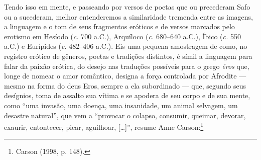 Tendo isso em mente, e passeando por versos de poetas que ou precederam Safo ou
a sucederam, melhor entenderemos a similaridade tremenda entre as imagens, a
linguagem e o tom de seus fragmentos eróticos e de versos marcados pelo
erotismo em Hesíodo (\textit{c.} 700 a.C.), Arquíloco (\textit{c.} 680--640
a.C.), Íbico (\textit{c.} 550 a.C.) e Eurípides (\textit{c.} 482--406 a.C.). Eis
uma pequena amostragem de como, no registro erótico de gêneros, poetas e
tradições distintos, é símil a linguagem para falar da paixão erótica, do
desejo nas traduções possíveis para o grego \textit{éros} que, longe de nomear
o amor romântico, designa a força controlada por Afrodite --- mesmo na forma do
deus Eros, sempre a ela subordinado --- que, segundo seus desígnios, toma de
assalto sua vítima e se apodera de seu corpo e de sua mente, como “uma invasão,
uma doença, uma insanidade, um animal selvagem, um desastre natural”, que vem a
“provocar o colapso, consumir, queimar, devorar, exaurir, entontecer, picar,
aguilhoar, [\ldots{}]”, resume Anne Carson:\footnote{ Carson (1998, p. 148).}

